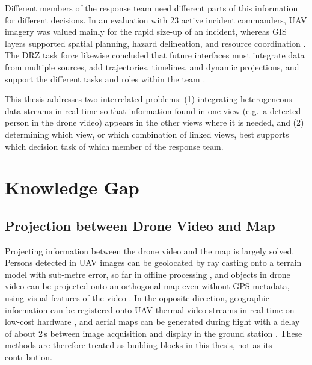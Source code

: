 \documentclass{article}
\begin{document}
Different members of the response team need different parts of this information for different decisions.
In an evaluation with 23 active incident commanders, UAV imagery was valued mainly for the rapid size-up of an incident, whereas GIS layers supported spatial planning, hazard delineation, and resource coordination \cite{hancko2026c2}.
The DRZ task force likewise concluded that future interfaces must integrate data from multiple sources, add trajectories, timelines, and dynamic projections, and support the different tasks and roles within the team \cite{surmann2024}.

This thesis addresses two interrelated problems:
(1) integrating heterogeneous data streams in real time so that information found in one view (e.g.\ a detected person in the drone video) appears in the other views where it is needed, and
(2) determining which view, or which combination of linked views, best supports which decision task of which member of the response team.

\section{Knowledge Gap}

\subsection{Projection between Drone Video and Map}
Projecting information between the drone video and the map is largely solved.
Persons detected in UAV images can be geolocated by ray casting onto a terrain model with sub-metre error, so far in offline processing \cite{paulin2023raycast}, and objects in drone video can be projected onto an orthogonal map even without GPS metadata, using visual features of the video \cite{nath2021gpsdenied}.
In the opposite direction, geographic information can be registered onto UAV thermal video streams in real time on low-cost hardware \cite{ren2022argeoreg}, and aerial maps can be generated during flight with a delay of about 2\,s between image acquisition and display in the ground station \cite{hein2019realtime}.
These methods are therefore treated as building blocks in this thesis, not as its contribution.
\end{document}
